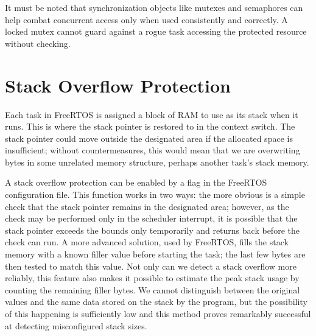 It must be noted that synchronization objects like mutexes and semaphores can help combat concurrent access only when used consistently and correctly. A locked mutex cannot guard against a rogue task accessing the protected resource without checking.

\section{Stack Overflow Protection}

Each task in FreeRTOS is assigned a block of \gls{RAM} to use as its stack when it runs. This is where the stack pointer is restored to in the context switch. The stack pointer could move outside the designated area if the allocated space is insufficient; without countermeasures, this would mean that we are overwriting bytes in some unrelated memory structure, perhaps another task's stack memory.

A stack overflow protection can be enabled by a flag in the FreeRTOS configuration file. This function works in two ways: the more obvious is a simple check that the stack pointer remains in the designated area; however, as the check may be performed only in the scheduler interrupt, it is possible that the stack pointer exceeds the bounds only temporarily and returns back before the check can run. A more advanced solution, used by FreeRTOS, fills the stack memory with a known filler value before starting the task; the last few bytes are then tested to match this value. Not only can we detect a stack overflow more reliably, this feature also makes it possible to estimate the peak stack usage by counting the remaining filler bytes. We cannot distinguish between the original values and the same data stored on the stack by the program, but the possibility of this happening is sufficiently low and this method proves remarkably successful at detecting misconfigured stack sizes.

